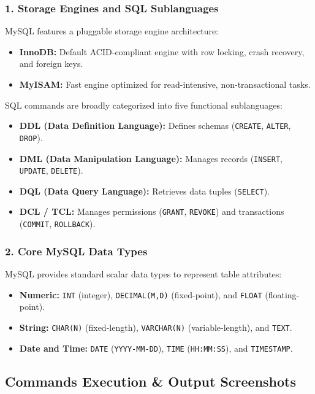 \subsubsection*{1. Storage Engines and SQL Sublanguages}
MySQL features a pluggable storage engine architecture:
\begin{itemize}[noitemsep,topsep=2pt]
    \item \textbf{InnoDB:} Default ACID-compliant engine with row locking, crash recovery, and foreign keys.
    \item \textbf{MyISAM:} Fast engine optimized for read-intensive, non-transactional tasks.
\end{itemize}
SQL commands are broadly categorized into five functional sublanguages:
\begin{itemize}[noitemsep,topsep=2pt]
    \item \textbf{DDL (Data Definition Language):} Defines schemas (\texttt{CREATE}, \texttt{ALTER}, \texttt{DROP}).
    \item \textbf{DML (Data Manipulation Language):} Manages records (\texttt{INSERT}, \texttt{UPDATE}, \texttt{DELETE}).
    \item \textbf{DQL (Data Query Language):} Retrieves data tuples (\texttt{SELECT}).
    \item \textbf{DCL / TCL:} Manages permissions (\texttt{GRANT}, \texttt{REVOKE}) and transactions (\texttt{COMMIT}, \texttt{ROLLBACK}).
\end{itemize}

\subsubsection*{2. Core MySQL Data Types}
MySQL provides standard scalar data types to represent table attributes:
\begin{itemize}[noitemsep,topsep=2pt]
    \item \textbf{Numeric:} \texttt{INT} (integer), \texttt{DECIMAL(M,D)} (fixed-point), and \texttt{FLOAT} (floating-point).
    \item \textbf{String:} \texttt{CHAR(N)} (fixed-length), \texttt{VARCHAR(N)} (variable-length), and \texttt{TEXT}.
    \item \textbf{Date and Time:} \texttt{DATE} (\texttt{YYYY-MM-DD}), \texttt{TIME} (\texttt{HH:MM:SS}), and \texttt{TIMESTAMP}.
\end{itemize}

\newpage

\subsection*{Commands Execution \& Output Screenshots}

